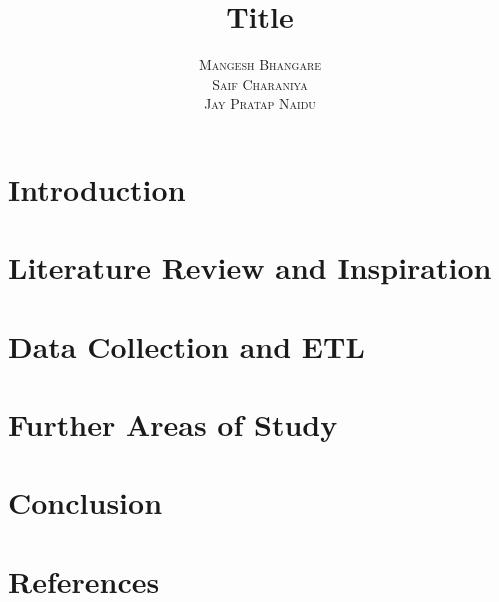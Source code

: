 \documentclass[twoside]{article}
\title{\vspace{-15mm}%
	\fontsize{24pt}{10pt}\selectfont
	\textbf{Title}
	}
\author{%
	\large
	\textsc{Mangesh Bhangare}\\
	\textsc{Saif Charaniya}\\
	\textsc{Jay Pratap Naidu}\\
	\vspace{-5mm}
	}
\date{}
\begin{document}
\maketitle
\thispagestyle{fancy}

\begin{abstract}

\end{abstract}

\begin{multicols*}{2}

\section{Introduction}

\section{Literature Review and Inspiration}

\section{Data Collection and ETL}

\section{Further Areas of Study}

\section{Conclusion}

\section{References}

\begingroup
\renewcommand{\section}[2]{}%


\endgroup

\end{multicols*}
\end{document}
